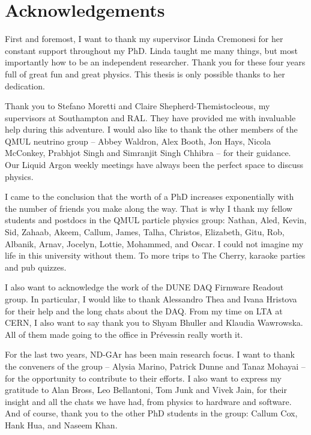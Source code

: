  \chapter*{Acknowledgements}
\label{C:Acknowledgements}

First and foremost, I want to thank my supervisor Linda Cremonesi for her constant support throughout my PhD. Linda taught me many things, but most importantly how to be an independent researcher. Thank you for these four years full of great fun and great physics. This thesis is only possible thanks to her dedication.

Thank you to Stefano Moretti and Claire Shepherd-Themistocleous, my supervisors at Southampton and RAL. They have provided me with invaluable help during this adventure. I would also like to thank the other members of the QMUL neutrino group -- Abbey Waldron, Alex Booth, Jon Hays, Nicola McConkey, Prabhjot Singh and Simranjit Singh Chhibra -- for their guidance. Our Liquid Argon weekly meetings have always been the perfect space to discuss physics.

I came to the conclusion that the worth of a PhD increases exponentially with the number of friends you make along the way. That is why I thank my fellow students and postdocs in the QMUL particle physics group: Nathan, Aled, Kevin, Sid, Zahaab, Akeem, Callum, James, Talha, Christos, Elizabeth, Gitu, Rob, Albanik, Arnav, Jocelyn, Lottie, Mohammed, and Oscar. I could not imagine my life in this university without them. To more trips to The Cherry, karaoke parties and pub quizzes.

I also want to acknowledge the work of the DUNE DAQ Firmware Readout group. In particular, I would like to thank Alessandro Thea and Ivana Hristova for their help and the long chats about the DAQ. From my time on LTA at CERN, I also want to say thank you to Shyam Bhuller and Klaudia Wawrowska. All of them made going to the office in Pr\'{e}vessin really worth it.

For the last two years, ND-GAr has been main research focus. I want to thank the conveners of the group -- Alysia Marino, Patrick Dunne and Tanaz Mohayai -- for the opportunity to contribute to their efforts. I also want to express my gratitude to Alan Bross, Leo Bellantoni, Tom Junk and Vivek Jain, for their insight and all the chats we have had, from physics to hardware and software. And of course, thank you to the other PhD students in the group: Callum Cox, Hank Hua, and Naseem Khan.

